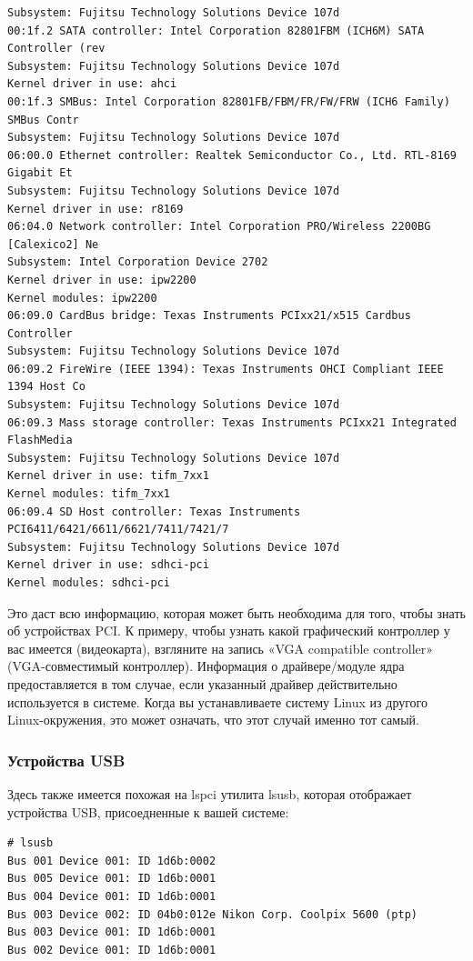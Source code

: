 \documentclass[10pt]{book}
\begin{document}
\begin{tcolorbox}
\begin{lstlisting}
Subsystem: Fujitsu Technology Solutions Device 107d
00:1f.2 SATA controller: Intel Corporation 82801FBM (ICH6M) SATA Controller (rev
Subsystem: Fujitsu Technology Solutions Device 107d
Kernel driver in use: ahci
00:1f.3 SMBus: Intel Corporation 82801FB/FBM/FR/FW/FRW (ICH6 Family) SMBus Contr
Subsystem: Fujitsu Technology Solutions Device 107d
06:00.0 Ethernet controller: Realtek Semiconductor Co., Ltd. RTL-8169 Gigabit Et
Subsystem: Fujitsu Technology Solutions Device 107d
Kernel driver in use: r8169
06:04.0 Network controller: Intel Corporation PRO/Wireless 2200BG [Calexico2] Ne
Subsystem: Intel Corporation Device 2702
Kernel driver in use: ipw2200
Kernel modules: ipw2200
06:09.0 CardBus bridge: Texas Instruments PCIxx21/x515 Cardbus Controller
Subsystem: Fujitsu Technology Solutions Device 107d
06:09.2 FireWire (IEEE 1394): Texas Instruments OHCI Compliant IEEE 1394 Host Co
Subsystem: Fujitsu Technology Solutions Device 107d
06:09.3 Mass storage controller: Texas Instruments PCIxx21 Integrated FlashMedia
Subsystem: Fujitsu Technology Solutions Device 107d
Kernel driver in use: tifm_7xx1
Kernel modules: tifm_7xx1
06:09.4 SD Host controller: Texas Instruments PCI6411/6421/6611/6621/7411/7421/7
Subsystem: Fujitsu Technology Solutions Device 107d
Kernel driver in use: sdhci-pci
Kernel modules: sdhci-pci
\end{lstlisting}
\end{tcolorbox}

Это даст всю информацию, которая может быть необходима для того, чтобы знать об устройствах PCI. К примеру, чтобы узнать какой графический контроллер  у вас имеется (видеокарта), взгляните на запись «VGA compatible controller» (VGA-совместимый контроллер).
Информация о драйвере/модуле ядра предоставляется в том случае, если указанный драйвер действительно используется в системе. Когда вы устанавливаете систему Linux из другого Linux-окружения, это может означать, что этот случай именно тот самый.

\subsubsection{Устройства USB}
Здесь также имеется похожая на lspci утилита lsusb, которая отображает устройства USB, присоедненные к вашей системе:

\vspace{3mm}
\begin{tcolorbox}
\begin{lstlisting}
# lsusb
Bus 001 Device 001: ID 1d6b:0002
Bus 005 Device 001: ID 1d6b:0001
Bus 004 Device 001: ID 1d6b:0001
Bus 003 Device 002: ID 04b0:012e Nikon Corp. Coolpix 5600 (ptp)
Bus 003 Device 001: ID 1d6b:0001
Bus 002 Device 001: ID 1d6b:0001
\end{lstlisting}
\end{tcolorbox}
\end{document}
